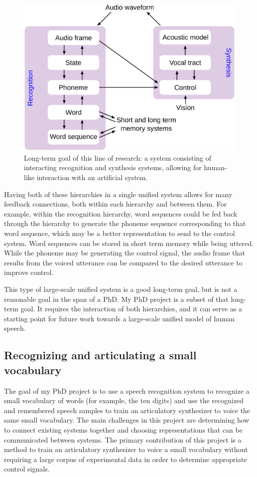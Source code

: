 \documentclass{article}
\begin{document}
\begin{figure}
  \begin{center}
    \includegraphics[width=0.7\linewidth]{longterm}
  \end{center}
  \caption{Long-term goal of this line of research: a system consisting
    of interacting recognition and synthesis systems,
    allowing for human-like interaction with an artificial system.}
  \label{fig:longterm}
\end{figure}

Having both of these hierarchies
in a single unified system
allows for many feedback connections,
both within each hierarchy
and between them.
For example, within the recognition hierarchy,
word sequences could be fed back through
the hierarchy to generate
the phoneme sequence corresponding
to that word sequence,
which may be a better representation
to send to the control system.
Word sequences can
be stored in short term memory
while being uttered.
While the phoneme may be
generating the control signal,
the audio frame that results from
the voiced utterance can be compared
to the desired utterance
to improve control.

This type of large-scale unified system
is a good long-term goal,
but is not a reasonable
goal in the span of a PhD.
My PhD project is a subset
of that long-term goal.
It requires the interaction of both hierarchies,
and it can serve as a starting point
for future work towards a large-scale
unified model of human speech.

\subsection{Recognizing and articulating a small vocabulary}
\label{subsec:proposal}

The goal of my PhD project is to
use a speech recognition system
to recognize a small vocabulary of words
(for example, the ten digits)
and use the recognized and remembered
speech samples to train
an articulatory synthesizer
to voice the same small vocabulary.
The main challenges in this project
are determining how to connect
existing systems together
and choosing representations that
can be communicated between systems.
The primary contribution of this project
is a method to train an
articulatory synthesizer
to voice a small vocabulary
without requiring a large corpus
of experimental data
in order to determine appropriate control signals.
\end{document}
